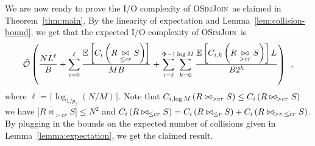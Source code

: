 \documentclass{llncs}
\newcommand{\Osymbol}{{\mathcal O}}
\newcommand{\TO}[1]{\tilde{\Osymbol}\left(#1\right)}
\newcommand{\E}[1]{\mathbb{E}\left[#1\right]}
\newcommand{\SimJoin}{\textsc{OSimJoin}}
\begin{document}
We are now ready to prove the I/O complexity of \SimJoin\ as claimed in Theorem~\ref{thm:main}.
By the linearity of expectation and Lemma~\ref{lem:collision-bound}, we get that the expected I/O complexity of \SimJoin\ is
$$
\TO{\frac{NL^{\ell}}{B} + \sum_{i=0}^\ell \frac{\E{\C{R \underset{\leq
cr}{\bowtie} S}}}{MB}
+ \sum_{i=\ell}^{\Psi-1}\sum_{k=0}^{\log
M}\frac{\E{\C[i,k]{ R \underset{> cr}{\bowtie}  S}} L
}{B 2^k}} \enspace,
$$
where $\ell=\lceil \log_{1/p_2}(N/M)\rceil$. 
Note that $\C[i,\log M]{ R \bowtie_{> cr} S}\leq \C{ R \bowtie_{> cr}  S}$ we have $|R \bowtie_{> cr}  S|\leq N^2$ and
$\C{R \bowtie_{\leq cr} S}=\C{R \bowtie_{\leq r} S}+\C{R \bowtie_{> r, \leq cr} S}$. By plugging in the
bounds on the expected number of collisions given in Lemma~\ref{lemma:expectation}, we get the claimed result.
\end{document}
